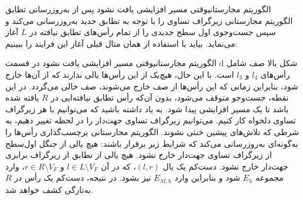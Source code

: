 \begin{itemframe-s}{الگوریتم مجارستانی}{وقتی مسیر افزایشی یافت نشود}
\itm
پس از به‌روزرسانی تطابق الگوریتم مجارستانی زیرگراف تساوی را با توجه به تطابق جدید به‌روزرسانی می‌کند و سپس جست‌وجوی اول سطح جدیدی را از تمام رأس‌های تطابق نیافته در $L$ آغاز می‌نماید. بیاید با استفاده از همان مثال قبلی آغاز این فرایند را ببینیم:
\end{itemframe-s}


\begin{itemframe-s}{الگوریتم مجارستانی}{وقتی مسیر افزایشی یافت نشود}
\itm
در قسمت d شکل بالا صف شامل رأس‌های
$l_4$ و
$l_3$
است. با این حال، هیچ‌یک از این رأس‌ها یالی ندارند که از آن‌ها خارج شود، بنابراین زمانی که این رأس‌ها از صف خارج می‌شوند، صف خالی می‌گردد. در این نقطه، جست‌وجو متوقف می‌شود، بدون آن‌که رأس تطابق نیافته‌ایی در $R$ یافته شده باشد تا یک مسیر افزایشی پیدا شود.
\itm
به یاد داشته باشید که می‌توانیم با هر زیرگراف تساوی دلخواه کار کنیم. می‌توانیم زیرگراف تساوی جهت‌دار را در لحظه تغییر دهیم، به شرطی که تلاش‌های پیشین خنثی نشوند. الگوریتم مجارستانی برچسب‌گذاری رأس‌ها را به‌گونه‌ای به‌روزرسانی می‌کند که شرایط زیر برقرار باشند:
\itm
هیچ یالی از جنگل اول‌سطح از زیرگراف تساوی جهت‌دار خارج نشود.
\itm
هیچ یالی از تطابق از زیرگراف برابری جهت‌دار خارج نشود.
\itm
دست‌کم یک یال $(l, r)$، که در آن $l \in L \setminus V_F$ و $r \in R \setminus V_F$، وارد مجموعه $E_h$ شود و بنابراین وارد $E_{M,h}$ نیز بشود. در نتیجه، دست‌کم یک رأس در $R$ به‌تازگی کشف خواهد شد.
\end{itemframe-s}
\iffalse





\fi
